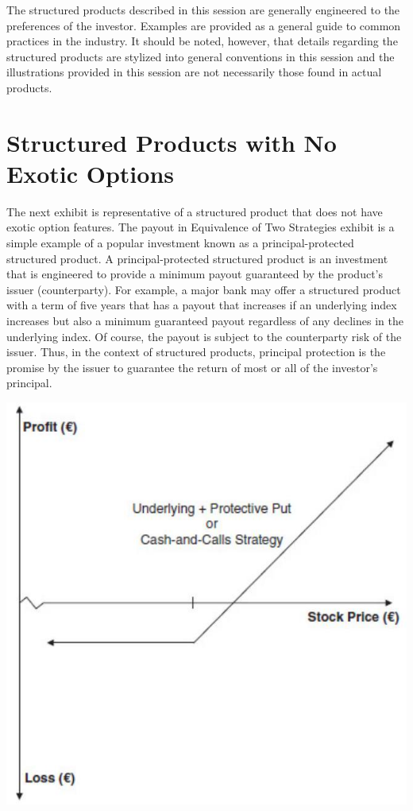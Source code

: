 \documentclass[11pt]{article}
\begin{document}
The structured products described in this session are generally engineered to the preferences of the investor. Examples are provided as a general guide to common practices in the industry. It should be noted, however, that details regarding the structured products are stylized into general conventions in this session and the illustrations provided in this session are not necessarily those found in actual products.

\section*{Structured Products with No Exotic Options}
The next exhibit is representative of a structured product that does not have exotic option features. The payout in Equivalence of Two Strategies exhibit is a simple example of a popular investment known as a principal-protected structured product. A principal-protected structured product is an investment that is engineered to provide a minimum payout guaranteed by the product's issuer (counterparty). For example, a major bank may offer a structured product with a term of five years that has a payout that increases if an underlying index increases but also a minimum guaranteed payout regardless of any declines in the underlying index. Of course, the payout is subject to the counterparty risk of the issuer. Thus, in the context of structured products, principal protection is the promise by the issuer to guarantee the return of most or all of the investor's principal.

\begin{center}
\includegraphics[max width=\textwidth]{2024_04_10_71ad1a12f130097be485g-2}
\end{center}
\end{document}
